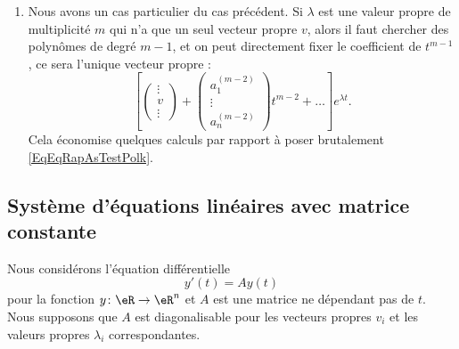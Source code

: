 \begin{enumerate}
\item\label{ItemRapSystDe}
Nous avons un cas particulier du cas précédent. Si $\lambda$ est une valeur propre de multiplicité $m$ qui n'a que un seul vecteur propre $v$, alors il faut chercher des polynômes de degré $m-1$, et on peut directement fixer le coefficient de $t^{m-1}$, ce sera l'unique vecteur propre :
\begin{equation}
\left[
	\begin{pmatrix}
	\vdots	\\ 
	v	\\ 
	\vdots	
\end{pmatrix}+
\begin{pmatrix}
	a_1^{(m-2)}	\\ 
	\vdots	\\ 
	a_n^{(m-2)}	
\end{pmatrix}t^{m-2}+\ldots
\right] e^{\lambda t}.
\end{equation}
Cela économise quelques calculs par rapport à poser brutalement \eqref{EqEqRapAsTestPolk}.

\end{enumerate}
\let\theenumi\oldTheEnumi

\subsection{Système d'équations linéaires avec matrice constante}

Nous considérons l'équation différentielle
\begin{equation}    \label{EqOOsXZJ}
    y'(t)=Ay(t)
\end{equation}
pour la fonction \( y\colon \eR\to \eR^n\) et \( A\) est une matrice ne dépendant pas de \( t\). Nous supposons que \( A\) est diagonalisable pour les vecteurs propres \( v_i\) et les valeurs propres \( \lambda_i\) correspondantes.

